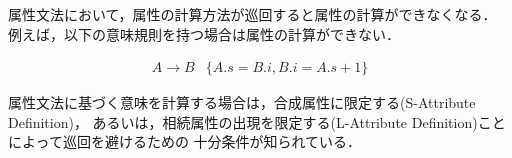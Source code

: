\documentclass[dvipdfmx,a4j]{jbook}
\begin{document}
属性文法において，属性の計算方法が巡回すると属性の計算ができなくなる．
例えば，以下の意味規則を持つ場合は属性の計算ができない．

\[\begin{array}{ll}
  A\rightarrow B & \{A.s = B.i, B.i = A.s + 1\}
\end{array}\]

属性文法に基づく意味を計算する場合は，合成属性に限定する(S-Attribute Definition)，
あるいは，相続属性の出現を限定する(L-Attribute Definition)ことによって巡回を避けるための
十分条件が知られている．






\end{document}
